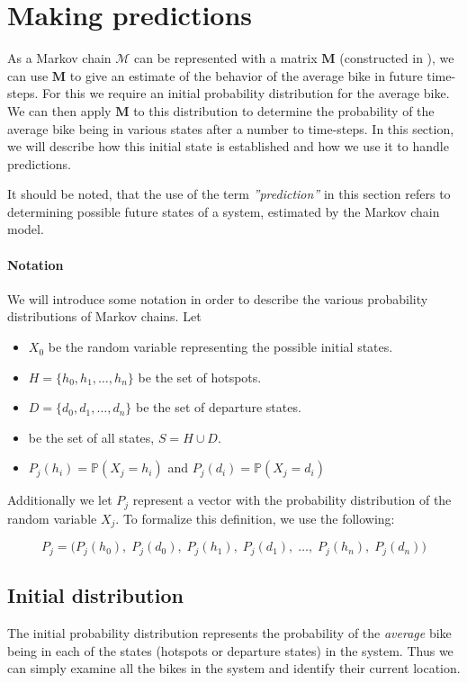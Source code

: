 \section{Making predictions}
As a Markov chain $\mathcal{M}$ can be represented with a matrix $\mathbf{M}$ (constructed in ), we can use $\mathbf{M}$ to give an estimate of the behavior of the average bike in future time-steps.
For this we require an initial probability distribution for the average bike.
We can then apply $\mathbf{M}$ to this distribution to determine the probability of the average bike being in various states after a number to time-steps.
In this section, we will describe how this initial state is established and how we use it to handle predictions.

It should be noted, that the use of the term \textit{''prediction''} in this section refers to determining possible future states of a system, estimated by the Markov chain model.

\paragraph{Notation}
We will introduce some notation in order to describe the various probability distributions of Markov chains.
Let
\begin{itemize}
\item $X_0$ be the random variable representing the possible initial states.
\item $H = \{h_0, h_1, \dots, h_n\}$ be the set of hotspots.
\item $D = \{d_0, d_1, \dots, d_n\}$ be the set of departure states.
\item be the set of all states, $S = H \cup D$.
\item $P_j(h_i) = \mathbb{P}(X_j = h_i)$ and $P_j(d_i) = \mathbb{P}(X_j = d_i)$
\end{itemize}

Additionally we let $P_j$ represent a vector with the probability distribution of the random variable $X_j$.
To formalize this definition, we use the following:

\begin{equation}\label{markov:vector}
P_j = \Big(
P_j(h_0),\;
P_j(d_0),\;
P_j(h_1),\;
P_j(d_1),\;
\dots,\;
P_j(h_n),\;
P_j(d_n)
\Big)
\end{equation}

\subsection{Initial distribution}
The initial probability distribution represents the probability of the \textit{average} bike being in each of the states (hotspots or departure states) in the system.
Thus we can simply examine all the bikes in the system and identify their current location.

